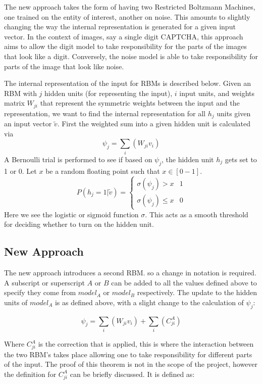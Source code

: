 The new approach takes the form of having two Restricted Boltzmann Machines, one trained on the entity of interest, another on noise. 
This amounts to slightly changing the way the internal representation is generated for a given input vector. In the context of images, say a single digit CAPTCHA, this approach aims to allow the digit model to take responsibility for the parts of the images that look like a digit. Conversely, the noise model is able to take responsibility for parts of the image that look like noise. 

The internal representation of the input for RBMs is described below.
Given an RBM with $j$ hidden units (for representing the input), $i$ input units, and weights matrix $W_{ji}$ that represent the symmetric weights between the input and the representation, we want to find the internal representation for all $ h_j $ units given an input vector $ \tilde{v} $.
First the weighted sum into a given hidden unit is calculated via 
$$ \psi_j = \sum_i ( W_{ji}v_i ) $$
A Bernoulli trial is performed to see if based on $ \psi_j $, the hidden unit $ h_j $ gets set to 1 or 0.
Let $ x  $ be a random floating point such that $ x \in [0-1] $.
$$ P(h_j = 1 | \tilde{v}) = 
\begin{cases} 
  \sigma(\psi_j) > x & 1 \\
  \sigma(\psi_j) \leq x & 0
\end{cases} $$
Here we see the logistic or sigmoid function $\sigma$. This acts as a smooth threshold for deciding whether to turn on the hidden unit.

\subsection{New Approach}

The new approach introduces a second RBM. so a change in notation is required. A subscript or superscript $A$ or $B$ can be added to all the values defined above to specify they come from $model_A$ or $model_B$ respectively. The update to the hidden units of $model_A$ is as defined above, with a slight change to the calculation of $\psi_j$:

$$ \psi_j = \sum_i ( W_{ji}v_i ) + \sum_i (C^A_{ji}) $$

Where $ C^A_{ji} $ is the correction that is applied, this is where the interaction between the two RBM's takes place allowing one to take responsibility for different parts of the input.
The proof of this theorem is not in the scope of the project, however the definition for $ C^A_{ji} $ can be briefly discussed. It is defined as:

